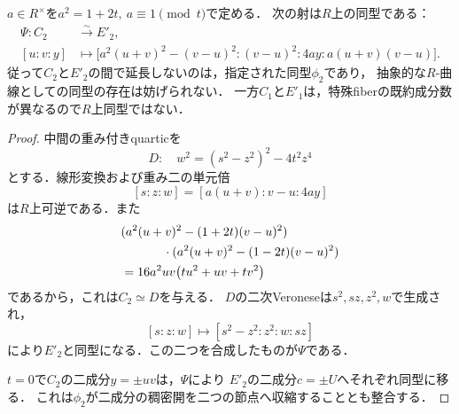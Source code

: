 \begin{proposition}[一致型の別同型はtrait全体へ延長する]
\label{prop:qa-coincident-alternative-model-isomorphism}
$a\in R^\times$を$a^2=1+2t,\ a\equiv1\pmod t$で定める．
次の射は$R$上の同型である：
\[
 \begin{split}
 \Psi:C_2&\xrightarrow{\sim}E'_2,\\
 [u:v:y]&\longmapsto
 \bigl[a^2(u+v)^2-(v-u)^2:(v-u)^2:4ay:a(u+v)(v-u)\bigr].
 \end{split}
\]
従って$C_2$と$E'_2$の間で延長しないのは，指定された同型$\phi_2$であり，
抽象的な$R$-曲線としての同型の存在は妨げられない．
一方$C_1$と$E'_1$は，特殊fiberの既約成分数が異なるので$R$上同型ではない．
\end{proposition}
\begin{proof}
中間の重み付きquarticを
\[
 D:\quad w^2=(s^2-z^2)^2-4t^2z^4
\]
とする．線形変換および重み二の単元倍
\[
 [s:z:w]=[a(u+v):v-u:4ay]
\]
は$R$上可逆である．また
\[
 \begin{split}
 &(a^2(u+v)^2-(1+2t)(v-u)^2)\\
 &\hspace{12mm}\cdot(a^2(u+v)^2-(1-2t)(v-u)^2)\\
 &=16a^2uv\bigl(tu^2+uv+tv^2\bigr)
 \end{split}
\]
であるから，これは$C_2\simeq D$を与える．
$D$の二次Veroneseは$s^2,sz,z^2,w$で生成され，
\[
 [s:z:w]\longmapsto[s^2-z^2:z^2:w:sz]
\]
により$E'_2$と同型になる．この二つを合成したものが$\Psi$である．

$t=0$で$C_2$の二成分$y=\pm uv$は，$\Psi$により
$E'_2$の二成分$c=\pm U$へそれぞれ同型に移る．
これは$\phi_2$が二成分の稠密開を二つの節点へ収縮することとも整合する．
\end{proof}

